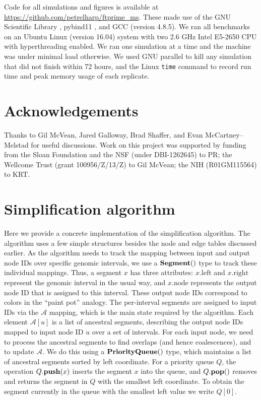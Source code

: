 \documentclass{article}
\newcommand{\Al}{\mathcal{A}}  %
\newcommand{\priorityq}[1]{\mbox{\textbf{PriorityQueue}}({#1})}
\newcommand{\pqpush}[2]{#1.\mbox{\textbf{push}}(#2)}
\newcommand{\pqpop}[1]{#1.\mbox{\textbf{pop}}()}
\newcommand{\ancsegment}[1]{\mbox{\textbf{Segment}}(#1)}
\newcommand{\attrleft}[1]{#1.\mbox{left}}
\newcommand{\attrright}[1]{#1.\mbox{right}}
\newcommand{\attrnode}[1]{#1.\mbox{node}}
\begin{document}
Code for all simulations and figures is available at \url{https://github.com/petrelharp/ftprime_ms}.
These made use of the GNU Scientific Library \citep[version 1.16][]{galassi2018scientific},
pybind11 \citep[version 2.2.1][]{pybind11},
and GCC (version 4.8.5).
We ran all benchmarks on an Ubuntu Linux (version 16.04) system with two 2.6 GHz Intel E5-2650 CPU with
hyperthreading enabled.
We ran one simulation at a time and the machine was under minimal load otherwise.
We used GNU parallel \citep{Tange2011a} to kill any simulation that did not finish within 72 hours,
and the Linux \texttt{time} command to record run time and peak memory usage of each replicate.


\section*{Acknowledgements}
Thanks to Gil McVean, Jared Galloway, Brad Shaffer, and Evan McCartney--Melstad for useful discussions.
Work on this project was supported by funding from
the Sloan Foundation and the NSF (under DBI-1262645) to PR;
the Wellcome Trust (grant 100956/Z/13/Z) to Gil McVean;
the NIH (R01GM115564) to KRT.



\appendix

\section{Simplification algorithm}
\label{ss:simplify_algorithm}

Here we provide a concrete implementation of the simplification algorithm.
The algorithm uses a few simple structures
besides the node and edge tables discussed earlier. As the algorithm needs to track the mapping
between input and output node IDs over specific genomic intervals, we use a $\ancsegment$
type to track these individual mappings. Thus, a segment $x$ has three attributes:
$\attrleft{x}$ and $\attrright{x}$ represent the genomic interval in the usual way,
and $\attrnode{x}$ represents the output node ID that is assigned to this interval.
These output node IDs correspond to colors in the ``paint pot'' analogy.
The per-interval segments are assigned to input IDs via the $\Al$ mapping,
which is the main state required by the algorithm. Each element $\Al[u]$
is a list of ancestral segments, describing the output node IDs mapped to input
node ID $u$ over a set of intervals.
For each input node, we need to process the ancestral segments
to find overlaps (and hence coalescences), and to update $\Al$.
We do this using a $\priorityq{}$ type, which maintains a list of ancestral
segments sorted by left coordinate. For a priority queue $Q$, the operation
$\pqpush{Q}{x}$ inserts the segment $x$ into the queue, and $\pqpop{Q}$
removes and returns the segment in $Q$ with the smallest left coordinate.
To obtain the segment currently in the queue with the smallest left value we
write $Q[0]$.
\end{document}
